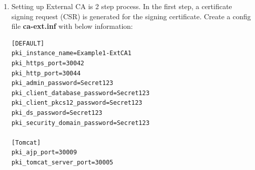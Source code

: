 \documentclass[12pt]{report}
\begin{document}
\begin{enumerate}[label*=\arabic*.]
\begin{enumerate}[label*=\arabic*.]
\begin{lstlisting}[style=configFile]
[admin]
ServerAdminID=admin
ServerAdminPwd=Secret123
SysUser=nobody
                        \end{lstlisting}            
                        \begin{lstlisting}[style=bashInputStyle]
$ setup-ds.pl --silent --file=ca-ext-ds.inf --debug                        
                        \end{lstlisting}
                    \item \label{ca3.1} Setting up External CA is 2 step process.  In the first step, a certificate signing request (CSR) 
                        is generated for the signing certificate. Create a config file \textbf{ca-ext.inf} with below information:
                        \begin{lstlisting}[style=configFile]
[DEFAULT]
pki_instance_name=Example1-ExtCA1
pki_https_port=30042
pki_http_port=30044
pki_admin_password=Secret123
pki_client_database_password=Secret123
pki_client_pkcs12_password=Secret123
pki_ds_password=Secret123
pki_security_domain_password=Secret123

[Tomcat]
pki_ajp_port=30009
pki_tomcat_server_port=30005


\end{lstlisting}
\end{enumerate}
\end{enumerate}
\end{document}
